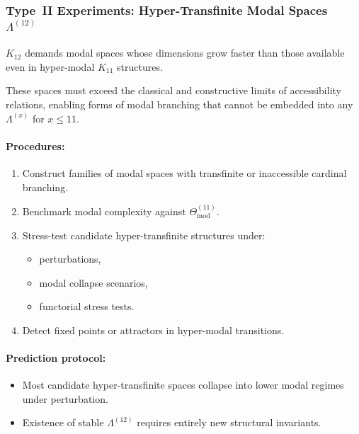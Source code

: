 \subsubsection{Type~II Experiments: Hyper-Transfinite Modal Spaces $\Lambda^{(12)}$}

$K_{12}$ demands modal spaces whose dimensions grow faster than those 
available even in hyper-modal $K_{11}$ structures.

These spaces must exceed the classical and constructive limits 
of accessibility relations, enabling forms of modal branching 
that cannot be embedded into any $\Lambda^{(x)}$ for $x \le 11$.

\paragraph{Procedures:}

\begin{enumerate}
    \item Construct families of modal spaces with transfinite or 
          inaccessible cardinal branching.
    \item Benchmark modal complexity against 
          $\Theta_{\mathrm{mod}}^{(11)}$.
    \item Stress-test candidate hyper-transfinite structures under:
          \begin{itemize}
              \item perturbations,
              \item modal collapse scenarios,
              \item functorial stress tests.
          \end{itemize}
    \item Detect fixed points or attractors in hyper-modal transitions.
\end{enumerate}

\paragraph{Prediction protocol:}

\begin{itemize}
    \item Most candidate hyper-transfinite spaces collapse into 
          lower modal regimes under perturbation.
    \item Existence of stable $\Lambda^{(12)}$ requires entirely new 
          structural invariants.
\end{itemize}



